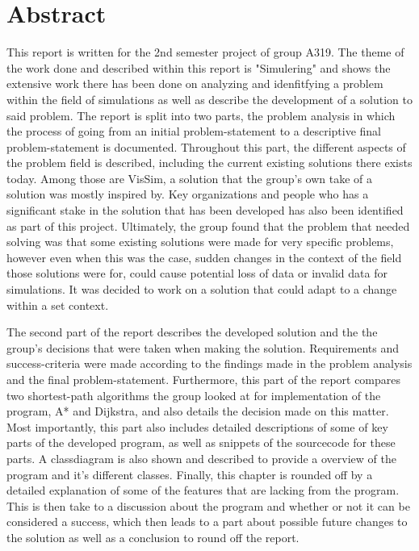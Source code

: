 \chapter{Abstract}\label{abstract}
This report is written for the 2nd semester project of group A319. The theme of the work done and described within this report is "Simulering" and shows the extensive work there has been done on analyzing and idenfitfying a problem within the field of simulations as well as describe the development of a solution to said problem. The report is split into two parts, the problem analysis in which the process of going from an initial problem-statement to a descriptive final problem-statement is documented. Throughout this part, the different aspects of the problem field is described, including the current existing solutions there exists today. Among those are VisSim, a solution that the group's own take of a solution was mostly inspired by. Key organizations and people who has a significant stake in the solution that has been developed has also been identified as part of this project. Ultimately, the group found that the problem that needed solving was that some existing solutions were made for very specific problems, however even when this was the case, sudden changes in the context of the field those solutions were for, could cause potential loss of data or invalid data for simulations. It was decided to work on a solution that could adapt to a change within a set context.

\vspace{5mm}

The second part of the report describes the developed solution and the the group's decisions that were taken when making the solution. Requirements and success-criteria were made according to the findings made in the problem analysis and the final problem-statement. Furthermore, this part of the report compares two shortest-path algorithms the group looked at for implementation of the program, A* and Dijkstra, and also details the decision made on this matter. Most importantly, this part also includes detailed descriptions of some of key parts of the developed program, as well as snippets of the sourcecode for these parts. A classdiagram is also shown and described to provide a overview of the program and it's different classes. Finally, this chapter is rounded off by a detailed explanation of some of the features that are lacking from the program. This is then take to a discussion about the program and whether or not it can be considered a  success, which then leads to a part about possible future changes to the solution as well as a conclusion to round off the report.
